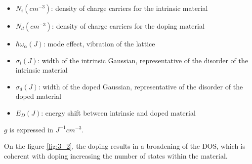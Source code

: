 \begin{itemize}
    \item $N_{i}(cm^{-3})$: density of charge carriers for the intrinsic material
    \item $N_{d}(cm^{-3})$: density of charge carriers for the doping material
    \item $\hbar \omega_\alpha(J)$: mode effect, vibration of the lattice
    \item $\sigma_i(J)$: width of the intrinsic Gaussian, representative of the disorder of the intrinsic material
    \item $\sigma_d(J)$: width of the doped Gaussian, representative of the disorder of the doped material
    \item $E_D(J)$: energy shift between intrinsic and doped material
\end{itemize}

$g$ is expressed in $J^{-1} cm^{-3}$.

On the figure \ref{fig:3_2}, the doping results in a broadening of the DOS, which is coherent with doping increasing the number of states within the material.

